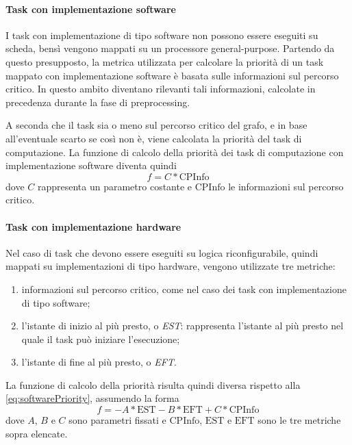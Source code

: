 \paragraph{Task con implementazione software}
I task con implementazione di tipo software non possono essere eseguiti su 
scheda, bensì vengono mappati su un processore general-purpose. Partendo da 
questo presupposto, la metrica utilizzata per calcolare la priorità di un task 
mappato con implementazione software è basata sulle informazioni sul percorso 
critico. In questo ambito diventano rilevanti tali informazioni, calcolate 
in precedenza durante la fase di preprocessing.

A seconda che il task sia o meno sul percorso critico del grafo, e in 
base all'eventuale scarto se così non è, viene calcolata la priorità del task 
di computazione. La funzione di calcolo della priorità dei task di computazione 
con implementazione software diventa quindi
\begin{equation} \label{eq:softwarePriority}
  f=C*\text{CPInfo}
\end{equation}
dove $C$ rappresenta un parametro costante e $\text{CPInfo}$ le informazioni sul 
percorso critico.

\paragraph{Task con implementazione hardware}
Nel caso di task che devono essere eseguiti su logica riconfigurabile, quindi 
mappati su implementazioni di tipo hardware, vengono utilizzate tre metriche:
\begin{enumerate}
 \item informazioni sul percorso critico, come nel caso dei task con 
implementazione di tipo software;
 \item l'istante di inizio al più presto, o \emph{\ac{EST}}: rappresenta 
l'istante al più presto nel quale il task può iniziare l'esecuzione;
 \item l'istante di fine al più presto, o \emph{\ac{EFT}}.
\end{enumerate}
La funzione di calcolo della priorità risulta quindi diversa rispetto alla 
\ref{eq:softwarePriority}, assumendo la forma
\begin{equation} \label{eq:hardwarePriority}
  f=-A*\text{EST} - B*\text{EFT} + C*\text{CPInfo}
\end{equation}
dove $A$, $B$ e $C$ sono parametri fissati e $\text{CPInfo}$, $\text{EST}$ e $\text{EFT}$ sono le 
tre metriche sopra elencate.

